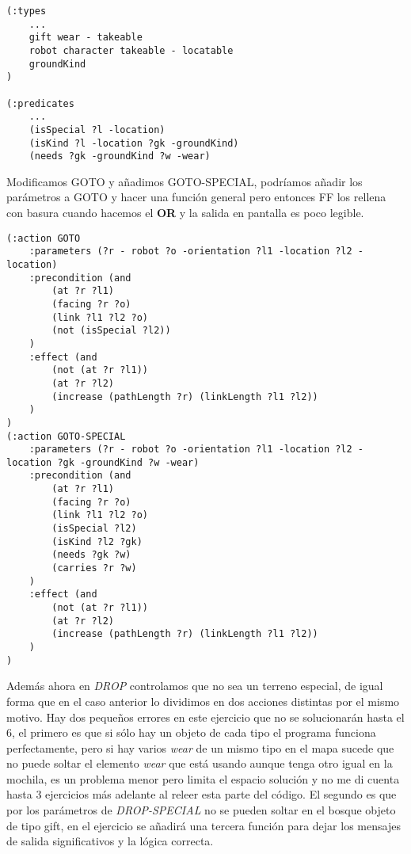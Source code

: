 \documentclass{article}
\begin{document}
\begin{lstlisting}
(:types
	...
	gift wear - takeable
	robot character takeable - locatable
	groundKind
)

(:predicates
	...
	(isSpecial ?l -location)
    (isKind ?l -location ?gk -groundKind)
    (needs ?gk -groundKind ?w -wear)

\end{lstlisting} 

Modificamos GOTO y añadimos GOTO-SPECIAL, podríamos añadir los parámetros a GOTO y hacer una función general pero entonces FF los rellena con basura cuando hacemos el \textbf{OR} y la salida en pantalla es poco legible.

\begin{lstlisting}
(:action GOTO
    :parameters (?r - robot ?o -orientation ?l1 -location ?l2 -location)
    :precondition (and
        (at ?r ?l1)
        (facing ?r ?o)
        (link ?l1 ?l2 ?o)
        (not (isSpecial ?l2))
    )
    :effect (and 
        (not (at ?r ?l1))
        (at ?r ?l2)
        (increase (pathLength ?r) (linkLength ?l1 ?l2))
    )
)
(:action GOTO-SPECIAL
    :parameters (?r - robot ?o -orientation ?l1 -location ?l2 -location ?gk -groundKind ?w -wear)
    :precondition (and 
        (at ?r ?l1)
        (facing ?r ?o)
        (link ?l1 ?l2 ?o)
        (isSpecial ?l2)
        (isKind ?l2 ?gk)
        (needs ?gk ?w)
        (carries ?r ?w)
    )
    :effect (and 
        (not (at ?r ?l1))
        (at ?r ?l2)
        (increase (pathLength ?r) (linkLength ?l1 ?l2))
    )
)
\end{lstlisting}

Además ahora en \emph{DROP} controlamos que no sea un terreno especial, de igual forma que en el caso anterior lo dividimos en dos acciones distintas por el mismo motivo. Hay dos pequeños errores en este ejercicio que no se solucionarán hasta el 6, el primero es que si sólo hay un objeto de cada tipo el programa funciona perfectamente, pero si hay varios \emph{wear} de un mismo tipo en el mapa sucede que no puede soltar el elemento \emph{wear} que está usando aunque tenga otro igual en la mochila, es un problema menor pero limita el espacio solución y no me di cuenta hasta 3 ejercicios más adelante al releer esta parte del código. El segundo es que por los parámetros de \emph{DROP-SPECIAL} no se pueden soltar en el bosque objeto de tipo gift, en el ejercicio se añadirá una tercera función para dejar los mensajes de salida significativos y la lógica correcta.
\end{document}
